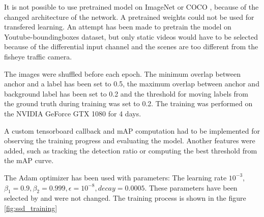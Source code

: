\documentclass[a4paper,12pt,titlepage, twoside]{article}
\numberwithin{figure}{section}
\begin{document}
It is not possible to use pretrained model on ImageNet\cite{deng2009imagenet} or COCO \cite{lin2014microsoft}, because of the changed architecture of the network. A pretrained weights could not be used for transfered learning. An attempt has been made to pretrain the model on Youtube-boundingboxes dataset\cite{real2017youtube}, but only static videos would have to be selected because of the differential input channel and the scenes are too different from the fisheye traffic camera.

The images were shuffled before each epoch. The minimum overlap between anchor and a label has been set to 0.5, the maximum overlap between anchor and background label has been set to 0.2 and the threshold for moving labels from the ground truth during training was set to 0.2. The training was performed on the NVIDIA GeForce GTX 1080 for 4 days.

A custom tensorboard callback and mAP computation had to be implemented for observing the training progress and evaluating the model. Another features were added, such as tracking the  detection ratio or computing the best threshold from the mAP curve. 

The Adam optimizer \cite{kingma2014adam} has been used with parameters: The learning rate $10^{-3}$, $\beta_1 = 0.9, \beta_2 = 0.999, \epsilon=10^{-8}, decay = 0.0005$. These parameters have been selected by \cite{ssd_keras} and were not changed. The training process is shown in the figure \ref{fig:ssd_training}
\end{document}
